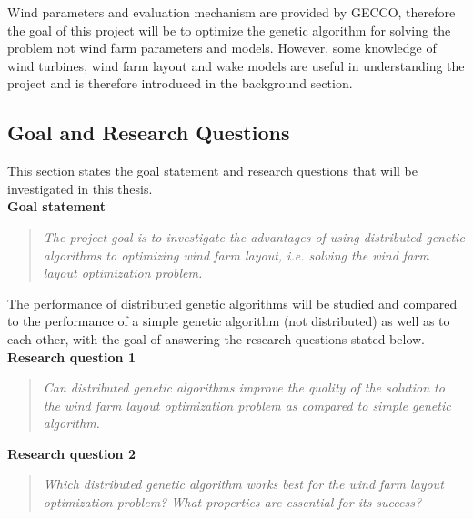 \noindent Wind parameters and evaluation mechanism are provided by GECCO, therefore the goal of this project will be to optimize the genetic algorithm for solving the problem not wind farm parameters and models. However, some knowledge of wind turbines, wind farm layout and wake models are useful in understanding the project and is therefore introduced in the background section. 


\subsection{Goal and Research Questions}
This section states the goal statement and research questions that will be investigated in this thesis. \\


\noindent \textbf{Goal statement}


\begin{quote}
\textit{The project goal is to investigate the advantages of using distributed genetic algorithms to optimizing wind farm layout, i.e. solving the wind farm layout optimization problem.} \citep{Samorani}
\end{quote}


\noindent The performance of distributed genetic algorithms will be studied and compared to the performance of a simple genetic algorithm (not distributed) as well as to each other, with the goal of answering the research questions stated below.\\


\noindent \textbf{Research question 1}


\begin{quote}
\textit{Can distributed genetic algorithms improve the quality of the solution to the wind farm layout optimization problem as compared to simple genetic algorithm.}
\end{quote}


\noindent \textbf{Research question 2}


\begin{quote}
\textit{Which distributed genetic algorithm works best for the wind farm layout optimization problem? What properties are essential for its success?}
\end{quote}
